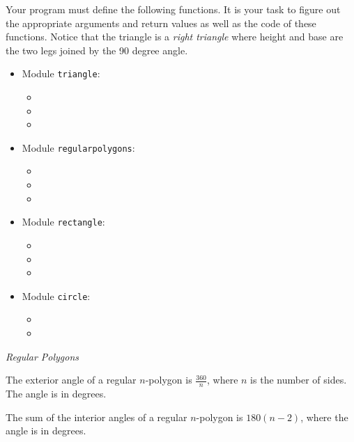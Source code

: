 \documentclass[11pt]{cselabheader}
\begin{document}
{\begin{ex}[geometry.py]
  Your program must define the following functions. It is your task to figure
  out the appropriate arguments and return values as well as the code of these
  functions. Notice that the triangle is a \emph{right triangle} where height
  and base are the two legs joined by the 90 degree angle.
  \begin{multicols}{2}
    \begin{itemize}
      \item Module \texttt{triangle}:
        \begin{itemize}
          \item {}
          \item {}
          \item {}
        \end{itemize}
      \item Module \texttt{regularpolygons}:
        \begin{itemize}
          \item {}
          \item {}
          \item {}
        \end{itemize}
      \item Module \texttt{rectangle}:
        \begin{itemize}
          \item{}
          \item {}
          \item {}
        \end{itemize}
      \item Module \texttt{circle}:
        \begin{itemize}
          \item {}
          \item {}
        \end{itemize}
    \end{itemize}
  \end{multicols}

  \emph{Regular Polygons}

  The exterior angle of a regular $n$-polygon is $\frac{360}{n}$, where $n$ is
  the number of sides. The angle is in degrees.

  The sum of the interior angles of a regular $n$-polygon is $180(n-2)$, where the
  angle is in degrees.


\end{ex}}
\end{document}
